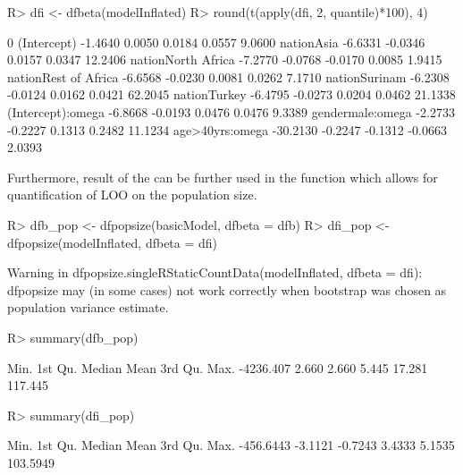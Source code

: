 \documentclass[
]{jss}
\newcommand{\1}{\mathcal{I}} \newcommand{\bZero}{\boldsymbol{0}}
\begin{document}
\begin{CodeChunk}
\begin{CodeInput}
R> dfi <- dfbeta(modelInflated)
R> round(t(apply(dfi, 2, quantile)*100), 4)
\end{CodeInput}
\begin{CodeOutput}
                           0%
(Intercept)           -1.4640  0.0050  0.0184  0.0557  9.0600
nationAsia            -6.6331 -0.0346  0.0157  0.0347 12.2406
nationNorth Africa    -7.2770 -0.0768 -0.0170  0.0085  1.9415
nationRest of Africa  -6.6568 -0.0230  0.0081  0.0262  7.1710
nationSurinam         -6.2308 -0.0124  0.0162  0.0421 62.2045
nationTurkey          -6.4795 -0.0273  0.0204  0.0462 21.1338
(Intercept):omega     -6.8668 -0.0193  0.0476  0.0476  9.3389
gendermale:omega      -2.2733 -0.2227  0.1313  0.2482 11.1234
age>40yrs:omega      -30.2130 -0.2247 -0.1312 -0.0663  2.0393
\end{CodeOutput}
\end{CodeChunk}

Furthermore, result of the  can be further used in the
function  which allows for quantification of LOO on the
population size.

\begin{CodeChunk}
\begin{CodeInput}
R> dfb_pop <- dfpopsize(basicModel, dfbeta = dfb)
R> dfi_pop <- dfpopsize(modelInflated, dfbeta = dfi)
\end{CodeInput}
\begin{CodeOutput}
Warning in dfpopsize.singleRStaticCountData(modelInflated, dfbeta = dfi):
dfpopsize may (in some cases) not work correctly when bootstrap was chosen as
population variance estimate.
\end{CodeOutput}
\begin{CodeInput}
R> summary(dfb_pop)
\end{CodeInput}
\begin{CodeOutput}
     Min.   1st Qu.    Median      Mean   3rd Qu.      Max. 
-4236.407     2.660     2.660     5.445    17.281   117.445 
\end{CodeOutput}
\begin{CodeInput}
R> summary(dfi_pop)
\end{CodeInput}
\begin{CodeOutput}
     Min.   1st Qu.    Median      Mean   3rd Qu.      Max. 
-456.6443   -3.1121   -0.7243    3.4333    5.1535  103.5949 
\end{CodeOutput}
\end{CodeChunk}
\end{document}
